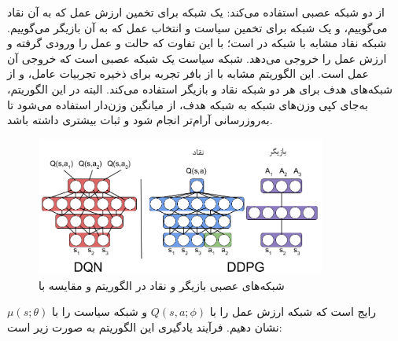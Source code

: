 از دو شبکه عصبی استفاده می‌کند\cite{silver2014deterministic}: یک شبکه برای تخمین ارزش عمل که به آن نقاد
 می‌گوییم، و یک شبکه برای تخمین سیاست و انتخاب عمل که به آن بازیگر
  می‌گوییم.
شبکه نقاد مشابه با شبکه
  در 
   است؛ با این تفاوت که حالت و عمل را ورودی گرفته و ارزش عمل را خروجی می‌دهد.
  شبکه سیاست یک شبکه عصبی است که خروجی آن عمل است.
 این الگوریتم مشابه با 
 از بافر تجربه برای ذخیره تجربیات عامل، و از شبکه‌های هدف برای هر دو شبکه نقاد و بازیگر استفاده می‌کند.
 البته در این الگوریتم، به‌جای کپی وزن‌های شبکه به شبکه هدف، از میانگین وزن‌دار استفاده می‌شود تا به‌روز‌رسانی آرام‌تر انجام شود و ثبات بیشتری داشته باشد.
 \begin{figure}[H]
    \centering
    \includegraphics[width=0.85\textwidth]{images/actor_critic.png}
    \caption{شبکه‌های عصبی بازیگر و نقاد در الگوریتم  و مقایسه با }\label{fig:actor_critic}
\end{figure}
رایج است که شبکه ارزش عمل را با $Q(s, a; \phi)$ و شبکه سیاست را با $\mu(s; \theta)$ نشان دهیم.
فرآیند یادگیری این الگوریتم به صورت زیر است:
